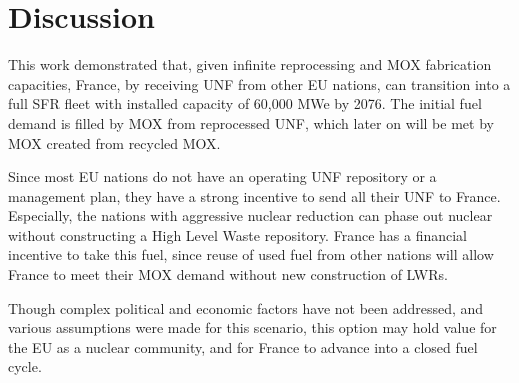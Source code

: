 \section{Discussion}
This work demonstrated that, given infinite
reprocessing and \gls{MOX} fabrication capacities,
France, by receiving \gls{UNF} from other \gls{EU} nations,
can transition into a full \gls{SFR} fleet
with installed capacity of 60,000 MWe by 2076.
The initial fuel demand is filled by \gls{MOX} from
reprocessed \gls{UNF}, which later on
will be met by \gls{MOX} created from recycled \gls{MOX}.

Since most \gls{EU} nations do not have an operating \gls{UNF}
repository or a management plan, they have a strong incentive
to send all their \gls{UNF} to France. Especially, the nations
with aggressive nuclear reduction can phase out nuclear
without constructing a High Level Waste repository. France has a financial
incentive to take this fuel, since reuse of used fuel from
other nations will allow France to meet their MOX demand
without new construction of \glspl{LWR}.

Though complex political and economic factors have not been
addressed, and various assumptions were made for this scenario,
this option may hold value for the \gls{EU} as a nuclear community,
and for France to advance into a closed fuel cycle.
